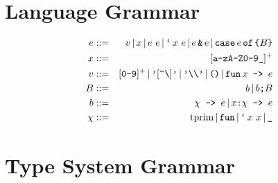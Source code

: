 \documentclass{article}
\begin{document}
\section*{Language Grammar}

\begin{eqnarray*}
    e               &::=&       v
                           \gOr x
                           \gOr e\ e
                           \gOr \gtBt x\ e
                           \gOr e \gtAmp e
                           \gOr \gtCase e \gtOf \texttt{\char`\{} B \texttt{\char`\}}
\\
    x               &::=&       [\texttt{a-zA-Z0-9\char`\_}]^+
\\
    v               &::=&       [\texttt{0-9}]^+
                           \gOr \texttt{'}[\texttt{\char`\^\char`\\}]\texttt{'}
                           \gOr \texttt{'\char`\\\char`\\'}
                           \gOr \texttt{()}
                           \gOr \gtFun x\texttt{ -> }e
\\
    B               &::=&       b
                           \gOr b\texttt{\char`\; }B
\\
    b               &::=&       \chi\texttt{ -> }e
                           \gOr x\texttt{:}\chi\texttt{ -> }e
\\
    \chi            &::=&       \tprim
                           \gOr \gtFun
                           \gOr \gtBt x\ x
                           \gOr \texttt{\char`\_}
\end{eqnarray*}


\section*{Type System Grammar}
\end{document}
